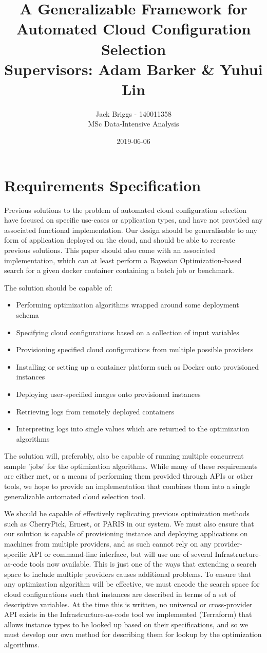 \documentclass{article}
\title{\vspace{-2.0cm} A Generalizable Framework for Automated Cloud Configuration Selection \\ \vspace{0.5cm} \large Supervisors: Adam Barker \& Yuhui Lin}
\date{2019-06-06}
\author{Jack Briggs - 140011358 \\ MSc Data-Intensive Analysis}
\begin{document}
\section{Requirements Specification}
Previous solutions to the problem of automated cloud configuration selection have focused on specific use-cases or application types, and have not provided any associated functional implementation.  Our design should be generalisable to any form of application deployed on the cloud, and should be able to recreate previous solutions. This paper should also come with an associated implementation, which can at least perform a Bayesian Optimization-based search for a given docker container containing a batch job or benchmark.

The solution should be capable of:
\begin{itemize}
\item Performing optimization algorithms wrapped around some deployment schema
\item Specifying cloud configurations based on a collection of input variables
\item Provisioning specified cloud configurations from multiple possible providers
\item Installing or setting up a container platform such as Docker onto provisioned instances
\item Deploying user-specified images onto provisioned instances
\item Retrieving logs from remotely deployed containers
\item Interpreting logs into single values which are returned to the optimization algorithms
\end{itemize}

The solution will, preferably, also be capable of running multiple concurrent sample 'jobs' for the optimization algorithms.
While many of these requirements are either met, or a means of performing them provided through APIs or other tools, we hope to provide an implementation that combines them into a single generalizable automated cloud selection tool. 


We should be capable of effectively replicating previous optimization methods such as CherryPick\cite{Alipourfard2017}, Ernest\cite{Venkataraman2016}, or PARIS\cite{Yadwadkar2017} in our system. We must also ensure that our solution is capable of provisioning instance and deploying applications on machines from multiple providers, and as such cannot rely on any provider-specific API or command-line interface, but will use one of several Infrastructure-as-code tools now available. This is just one of the ways that extending a search space to include multiple providers causes additional problems. To ensure that any optimization algorithm will be effective, we must encode the search space for cloud configurations such that instances are described in terms of a set of descriptive variables. At the time this is written, no universal or cross-provider API exists in the  Infrastructure-as-code tool we implemented (Terraform) that allows instance types to be looked up based on their specifications, and so we must develop our own method for describing them for lookup by the optimization algorithms.  
\end{document}
